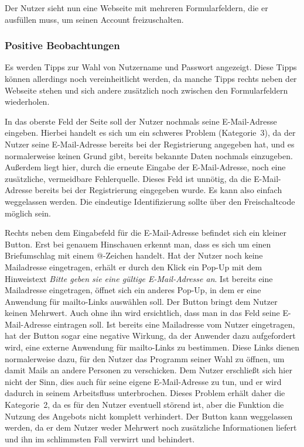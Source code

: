 Der Nutzer sieht nun eine Webseite mit mehreren Formularfeldern, die er ausfüllen muss, um seinen Account freizuschalten.

\subsubsection*{Positive Beobachtungen}
\label{subsubsec:freischaltung_webseite_positiv}
Es werden Tipps zur Wahl von Nutzername und Passwort angezeigt. Diese Tipps können allerdings noch vereinheitlicht werden, da manche Tipps rechts neben der Webseite stehen und sich andere zusätzlich noch zwischen den Formularfeldern wiederholen.

{
In das oberste Feld der Seite soll der Nutzer nochmals seine E\hbox{-}Mail-Adresse eingeben.
}
{
Hierbei handelt es sich um ein schweres Problem (Kategorie~3), da der Nutzer seine E\hbox{-}Mail-Adresse bereits bei der Registrierung angegeben hat, und es normalerweise keinen Grund gibt, bereits bekannte Daten nochmals einzugeben. Außerdem liegt hier, durch die erneute Eingabe der E\hbox{-}Mail-Adresse, noch eine zusätzliche, vermeidbare Fehlerquelle.
}
{
Dieses Feld ist unnötig, da die E\hbox{-}Mail-Adresse bereits bei der Registrierung eingegeben wurde. Es kann also einfach weggelassen werden. Die eindeutige Identifizierung sollte über den Freischaltcode möglich sein.
}
\label{prob:frei:emaileingabe}

{
Rechts neben dem Eingabefeld für die E\hbox{-}Mail-Adresse befindet sich ein kleiner Button. Erst bei genauem Hinschauen erkennt man, dass es sich um einen Briefumschlag mit einem @-Zeichen handelt. Hat der Nutzer noch keine Mailadresse eingetragen, erhält er durch den Klick ein Pop-Up mit dem Hinweistext \emph{ Bitte geben sie eine gültige E\hbox{-}Mail-Adresse an}. Ist bereits eine Mailadresse eingetragen, öffnet sich ein anderes Pop-Up, in dem er eine Anwendung für mailto-Links auswählen soll.
}
{
Der Button bringt dem Nutzer keinen Mehrwert. Auch ohne ihn wird ersichtlich, dass man in das Feld seine E\hbox{-}Mail-Adresse eintragen soll. Ist bereits eine Mailadresse vom Nutzer eingetragen, hat der Button sogar eine negative Wirkung, da der Anwender dazu aufgefordert wird, eine externe Anwendung für mailto-Links zu bestimmen. Diese Links dienen normalerweise dazu, für den Nutzer das Programm seiner Wahl zu öffnen, um damit Mails an andere Personen zu verschicken. Dem Nutzer erschließt sich hier nicht der Sinn, dies auch für seine eigene E\hbox{-}Mail-Adresse zu tun, und er wird dadurch in seinem Arbeitsfluss unterbrochen. Dieses Problem erhält daher die Kategorie~2, da es für den Nutzer eventuell störend ist, aber die Funktion die Nutzung des Angebots nicht komplett verhindert.
}
{
Der Button kann weggelassen werden, da er dem Nutzer weder Mehrwert noch zusätzliche Informationen liefert und ihn im schlimmsten Fall verwirrt und behindert.
}
\label{prob:frei:buttonmailto}

